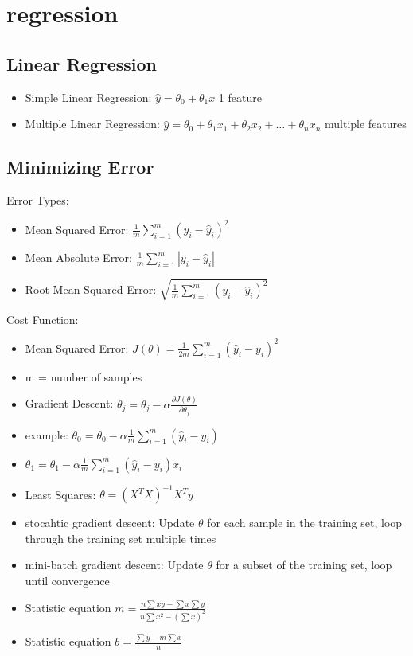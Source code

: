 \documentclass[conference]{IEEEtran}
\begin{document}
\section{regression}

\subsection{Linear Regression}

\begin{itemize}
    \item Simple Linear Regression: \(\hat{y} = \theta_0 + \theta_1 x\) 1 feature
    \item Multiple Linear Regression: \(\hat{y} = \theta_0 + \theta_1 x_1 + \theta_2 x_2 + \ldots + \theta_n x_n\) multiple features
\end{itemize}

\subsection{Minimizing Error}

Error Types:

\begin{itemize}
    \item Mean Squared Error: \(\frac{1}{m} \sum_{i=1}^{m} (y_i - \hat{y}_i)^2\)
    \item Mean Absolute Error: \(\frac{1}{m} \sum_{i=1}^{m} |y_i - \hat{y}_i|\)
    \item Root Mean Squared Error: \(\sqrt{\frac{1}{m} \sum_{i=1}^{m} (y_i - \hat{y}_i)^2}\)
\end{itemize}

Cost Function:

\begin{itemize}
    \item Mean Squared Error: \(J(\theta) = \frac{1}{2m} \sum_{i=1}^{m} (\hat{y}_i - y_i)^2\)
    \item m = number of samples
    \item Gradient Descent: \(\theta_j = \theta_j - \alpha \frac{\partial J(\theta)}{\partial \theta_j}\)
    \item example: \(\theta_0 = \theta_0 - \alpha \frac{1}{m} \sum_{i=1}^{m} (\hat{y}_i - y_i)\)
    \item  \(\theta_1 = \theta_1 - \alpha \frac{1}{m} \sum_{i=1}^{m} (\hat{y}_i - y_i) x_i\)
    \item Least Squares: \(\theta = (X^T X)^{-1} X^T y\)
    \item stocahtic gradient descent: Update \(\theta\) for each sample in the training set, loop through the training set multiple times
    \item mini-batch gradient descent: Update \(\theta\) for a subset of the training set, loop until convergence
    \item Statistic equation \(m = \frac{n \sum xy - \sum x \sum y}{n \sum x^2 - (\sum x)^2}\)
    \item Statistic equation \(b = \frac{\sum y - m \sum x}{n}\)
\end{itemize}
\end{document}
